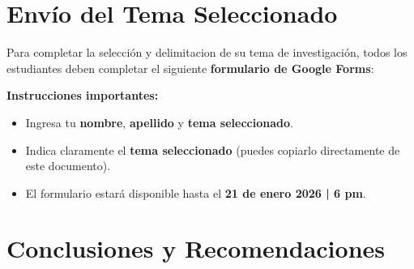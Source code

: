 \documentclass[12pt,a4paper]{article}
\begin{document}
\newpage
\section*{Envío del Tema Seleccionado}

Para completar la selección y delimitacion de su tema de investigación, todos los estudiantes deben completar el siguiente \textbf{formulario de Google Forms}:

\begin{center}
	\vspace{1cm}
\end{center}

\vspace{1cm}

\textbf{Instrucciones importantes:}
\begin{itemize}
	\item Ingresa tu \textbf{nombre}, \textbf{apellido} y \textbf{tema seleccionado}.
	\item Indica claramente el \textbf{tema seleccionado} (puedes copiarlo directamente de este documento).
	\item El formulario estará disponible hasta el \textbf{21 de enero 2026 | 6 pm}.
\end{itemize}



\section*{Conclusiones y Recomendaciones}
\end{document}
